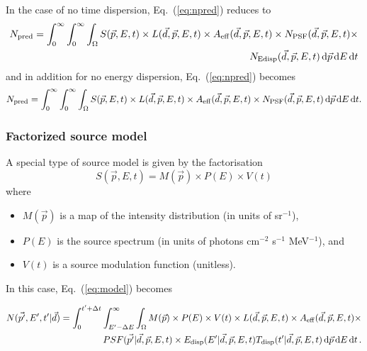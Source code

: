 \documentclass{article}[12pt,a4]
\begin{document}
In the case of no time dispersion, Eq.~(\ref{eq:npred}) reduces to 
\begin{eqnarray}
N_{\rm pred} = \int_{0}^{\infty} \int_{0}^{\infty} \int_{\Omega} 
S(\vec{p}, E, t) \times 
L(\vec{d}, \vec{p}, E, t) \times
A_{\rm eff}(\vec{d}, \vec{p}, E, t) \times
N_{\rm PSF}(\vec{d}, \vec{p}, E, t) \times \nonumber \\
N_{\rm Edisp}(\vec{d}, \vec{p}, E, t)
\, {\rm d}\vec{p} \, {\rm d}E \,{\rm d}t
\end{eqnarray}
and in addition for no energy dispersion, Eq.~(\ref{eq:npred}) becomes
\begin{equation}
N_{\rm pred} = \int_{0}^{\infty} \int_{0}^{\infty} \int_{\Omega} 
S(\vec{p}, E, t) \times 
L(\vec{d}, \vec{p}, E, t) \times
A_{\rm eff}(\vec{d}, \vec{p}, E, t) \times
N_{\rm PSF}(\vec{d}, \vec{p}, E, t)
\, {\rm d}\vec{p} \, {\rm d}E \,{\rm d}t .
\end{equation}


\subsubsection{Factorized source model}

A special type of source model is given by the factorisation
\begin{equation}
S(\vec{p}, E, t) = M(\vec{p}) \times P(E) \times V(t)
\end{equation}
where
\begin{itemize}
\item[] $M(\vec{p})$ is a map of the intensity distribution (in units of sr$^{-1}$),
\item[] $P(E)$ is the source spectrum (in units of photons cm$^{-2}$ s$^{-1}$ MeV$^{-1}$), and
\item[] $V(t)$ is a source modulation function (unitless).
\end{itemize}
In this case, Eq.~(\ref{eq:model}) becomes

\begin{eqnarray}
N(\vec{p'}, E', t' | \vec{d}) = \int_{0}^{t'+\Delta t} \int_{E'-\Delta E}^{\infty} \int_{\Omega} 
M(\vec{p}) \times P(E) \times V(t) \times 
L(\vec{d}, \vec{p}, E, t) \times
A_{\rm eff}(\vec{d}, \vec{p}, E, t) \times \nonumber \\
PSF(\vec{p'} | \vec{d}, \vec{p}, E, t) \times
E_{\rm disp}(E' | \vec{d}, \vec{p}, E, t) 
T_{\rm disp}(t' | \vec{d}, \vec{p}, E, t) 
\, {\rm d}\vec{p} \, {\rm d}E \, {\rm d}t \, .
\end{eqnarray}
\end{document}
